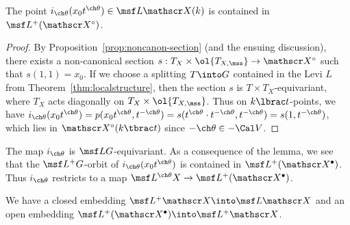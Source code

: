 \begin{lem}
\notready \label{lem:itheta-lands-open}
The point $i_{\ch\theta}(x_0 t^{\ch\theta}) \in \msf L \mathscr X(k)$ is contained in
$\msf L^+( \mathscr X^\circ )$.
\end{lem}
\begin{proof}
By Proposition~\ref{prop:noncanon-section} (and the ensuing discussion),
there exists a non-canonical section $s: T_X \times \ol{T_{X,\mss}} \to \mathscr X^\circ$
such that $s(1,1) = x_0$.
If we choose a splitting $T \into G$ contained in the Levi $L$ from Theorem~\ref{thm:localstructure}, then the section $s$ is $T \times T_X$-equivariant, where
$T_X$ acts diagonally on $T_X \times \ol{T_{X,\mss}}$.
Thus on $k\lbrac t$-points,
we have $i_{\ch\theta}(x_0 t^{\ch\theta}) = p(x_0 t^{\ch\theta}, t^{-\ch\theta})
= s(t^{\ch\theta}\cdot t^{-\ch\theta}, t^{-\ch\theta}) = s(1, t^{-\ch\theta})$,
which lies in $\mathscr X^\circ (k \tbrac t)$
since $-\ch\theta\in -\Cal V$.
\end{proof}

The map $i_{\ch\theta}$ is $\msf L G$-equivariant.
As a consequence of the lemma, we see that the $\msf L^+G$-orbit of
$i_{\ch\theta}(x_0 t^{\ch\theta})$ is contained in $\msf L^+(\mathscr X^\bullet)$.
Thus
$i_{\ch\theta}$ restricts to a map $\msf L^{\ch\theta}X \to \msf L^+(\mathscr X^\bullet)$.

We have a closed embedding $\msf L^+ \mathscr X \into \msf L \mathscr X$
and an open embedding $\msf L^+(\mathscr X^\bullet) \into \msf L^+\mathscr X$.

